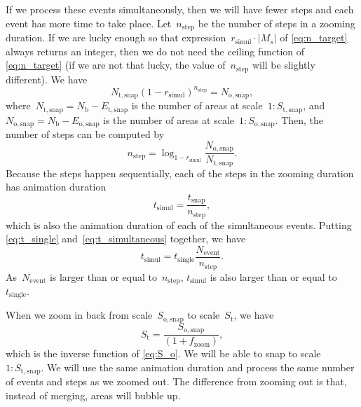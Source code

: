 \documentclass[twocolumn]{svjour3}          %
\begin{document}
If we process these events simultaneously, 
then we will have fewer steps and 
each event has more time to take place.
Let~$n_\mathrm{step}$ be the number of steps in a zooming duration.
If we are lucky enough so that
expression~$r_\mathrm{simul} \cdot |M_s|$ of \eq\ref{eq:n_target}
always returns an integer, 
then we do not need the ceiling function of \eq\ref{eq:n_target}
(if we are not that lucky, the value of~$n_\mathrm{step}$ will be slightly different).
We have 
\begin{equation*}
N_\mathrm{t,snap} (1-r_\mathrm{simul})^{n_\mathrm{step}} = N_\mathrm{o,snap},
\end{equation*}
where~$N_\mathrm{t,snap} = N_\mathrm{b}- E_\mathrm{t,snap}$ 
is the number of areas at scale~$1:S_\mathrm{t,snap}$,
and~$N_\mathrm{o,snap} = N_\mathrm{b}- E_\mathrm{o,snap}$
is the number of areas at scale~$1:S_\mathrm{o,snap}$.
Then, the number of steps can be computed by
\begin{equation*}
n_\mathrm{step} = \log_{1-r_\mathrm{simul}} 
    \frac{N_\mathrm{o,snap}}{N_\mathrm{t,snap}}.
\end{equation*}
Because the steps happen sequentially,
each of the steps in the zooming duration has
animation duration
\begin{equation}
\label{eq:t_simultaneous}
t_\mathrm{simul} = \frac{t_\mathrm{snap}}{n_\mathrm{step}},
\end{equation}
which is also the animation duration of each of the simultaneous events.
Putting \eqs\ref{eq:t_single} and~\ref{eq:t_simultaneous} together,
we have
\begin{equation*}
\label{eq:t_compare_appx}
t_\mathrm{simul} = t_\mathrm{single}  \frac{N_\mathrm{event}}{n_\mathrm{step}}.
\end{equation*}
As~$N_\mathrm{event}$ is larger than or equal to~$n_\mathrm{step}$,
$t_\mathrm{simul}$ is also larger than or equal to~$t_\mathrm{single}$.


When we zoom in back from scale~$S_\mathrm{o,snap}$ to scale~$S_\mathrm{t}$, 
we have
\begin{equation*}
\label{eq:S_i}
S_\mathrm{t} = \frac{S_\mathrm{o,snap}}{(1 + f_\mathrm{zoom})},
\end{equation*}
which is the inverse function of \eq\ref{eq:S_o}.
We will be able to snap to scale~$1:S_\mathrm{t,snap}$.
We will use the same animation duration and 
process the same number of events and steps as we zoomed out.
The difference from zooming out is that, instead of merging, 
areas will bubble up.
\end{document}
